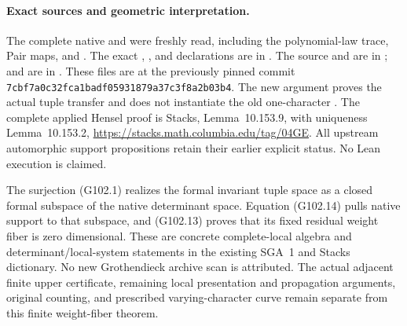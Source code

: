 \paragraph{Exact sources and geometric interpretation.}
The complete native  and
 were freshly
read, including the polynomial-law trace, Pair maps,
 and .
The exact , , 
and  declarations are in
.
The source  and  are in
;
 and  are in
.
These files are at the previously pinned commit
\texttt{7cbf7a0c32fca1badf05931879a37c3f8a2b03b4}.
The new argument proves the actual tuple transfer and does
not instantiate the old one-character .
The complete applied Hensel proof is Stacks,
Lemma~10.153.9, with uniqueness Lemma~10.153.2,
\url{https://stacks.math.columbia.edu/tag/04GE}.
All upstream automorphic support propositions retain their
earlier explicit status.  No Lean execution is claimed.

The surjection (G102.1) realizes the formal invariant tuple
space as a closed formal subspace of the native determinant
space.  Equation (G102.14) pulls native support to that
subspace, and (G102.13) proves that its fixed residual
weight fiber is zero dimensional.  These are concrete
complete-local algebra and determinant/local-system
statements in the existing SGA~1 and Stacks dictionary.
No new Grothendieck archive scan is attributed.
The actual adjacent finite upper certificate, remaining
local presentation and propagation arguments, original
counting, and prescribed varying-character curve remain
separate from this finite weight-fiber theorem.
